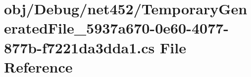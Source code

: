 \hypertarget{_debug_2net452_2_temporary_generated_file__5937a670-0e60-4077-877b-f7221da3dda1_8cs}{}\section{obj/\+Debug/net452/\+Temporary\+Generated\+File\+\_\+5937a670-\/0e60-\/4077-\/877b-\/f7221da3dda1.cs File Reference}
\label{_debug_2net452_2_temporary_generated_file__5937a670-0e60-4077-877b-f7221da3dda1_8cs}
